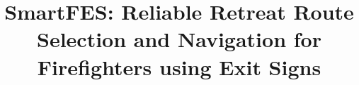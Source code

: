 \documentclass[conference]{IEEEtran}
\begin{document}
\newtheorem{definition}{Defination}
\newtheorem{theorem}{Theorem}
\newtheorem{lemma}[theorem]{Lemma}
\newtheorem{corollary}[theorem]{Corollary}
%
\title{SmartFES: Reliable Retreat Route Selection and Navigation for Firefighters using Exit Signs}




% 
\end{document}

